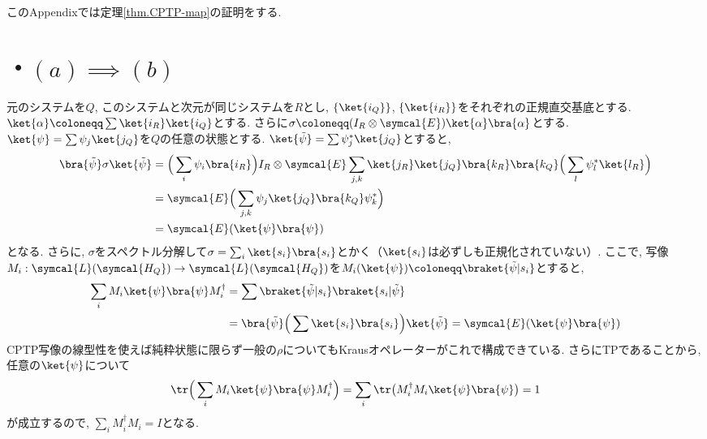 
このAppendixでは定理\ref{thm.CPTP-map}の証明をする. 

\section*{・$(a)\implies (b)$}
  元のシステムを$Q$, このシステムと次元が同じシステムを$R$とし, $\{\ket{i_Q}\}$, $\{\ket{i_R}\}$をそれぞれの正規直交基底とする. 
  $\ket{\alpha}\coloneqq \sum\ket{i_R}\ket{i_Q}$とする. 
  さらに$\sigma\coloneqq (I_R\otimes\symcal{E})\ket{\alpha}\bra{\alpha}$とする. 
  $\ket{\psi}=\sum\psi_j\ket{j_Q}$を$Q$の任意の状態とする. 
  $\ket{\tilde{\psi}}=\sum\psi_j^*\ket{j_Q}$とすると, 
  \begin{align}
    \bra{\tilde{\psi}}\sigma\ket{\tilde{\psi}}&=\Big(\sum_{i}\psi_i\bra{i_R}\Big)I_R\otimes\symcal{E}\sum_{j,k}\ket{j_R}\ket{j_Q}\bra{k_R}\bra{k_Q}\Big(\sum_{l}\psi_l^*\ket{l_R}\Big)\\
    &=\symcal{E}\Big(\sum_{j,k}\psi_j\ket{j_Q}\bra{k_Q}\psi_k^*\Big)\\
    &=\symcal{E}(\ket{\psi}\bra{\psi})
  \end{align}
  となる. 
  さらに, $\sigma$をスペクトル分解して$\sigma=\sum_i\ket{s_i}\bra{s_i}$とかく（$\ket{s_i}$は必ずしも正規化されていない）. 
  ここで, 写像$M_i:\symcal{L}(\symcal{H_Q})\to\symcal{L}(\symcal{H_Q})$を$M_i(\ket{\psi})\coloneqq\braket{\tilde{\psi}|s_i}$とすると, 
  \begin{align}
    \sum_i M_i\ket{\psi}\bra{\psi}M_i^{\dag}&=\sum \braket{\tilde{\psi}|s_i}\braket{s_i|\tilde{\psi}}\\
    &=\bra{\tilde{\psi}}\Big(\sum\ket{s_i}\bra{s_i}\Big)\ket{\tilde{\psi}}=\symcal{E}(\ket{\psi}\bra{\psi})
  \end{align}
  CPTP写像の線型性を使えば純粋状態に限らず一般の$\rho$についてもKrausオペレーターがこれで構成できている. 
  さらにTPであることから, 任意の$\ket{\psi}$について
  \begin{equation}
    \tr\Big(\sum_i M_i\ket{\psi}\bra{\psi}M_i^\dag\Big)=\sum_i\tr\big(M_i^\dag M_i\ket{\psi}\bra{\psi}\big)=1
  \end{equation}
  が成立するので, $\sum_i M_i^\dag M_i=I$となる. 


